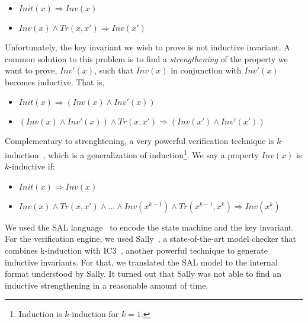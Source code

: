 \begin{itemize}
\item $Init(x) \Rightarrow Inv(x)$
\item $Inv(x) \wedge Tr(x,x') \Rightarrow Inv(x')$
\end{itemize}

Unfortunately, the key invariant we wish to prove is not inductive
invariant. A common solution to this problem is to find a
\emph{strengthening} of the property we want to prove, $Inv'(x)$, such
that $Inv(x)$ in conjunction with $Inv'(x)$ becomes inductive. That
is,

\begin{itemize}
\item $Init(x) \Rightarrow (Inv(x) \wedge Inv'(x))$
\item $(Inv(x) \wedge Inv'(x)) \wedge Tr(x,x') \Rightarrow (Inv(x') \wedge Inv'(x'))$
\end{itemize}

Complementary to strenghtening, a very powerful verification technique
is $k$-induction~\cite{MouraRS03}, which is a generalization of
induction\footnote{Induction is $k$-induction for $k=1$.}. We say a
property $Inv(x)$ is $k$-inductive if:

\begin{itemize}
\item $Init(x) \Rightarrow Inv(x)$
\item $Inv(x) \wedge Tr(x,x') \wedge \ldots \wedge Inv(x^{k-1}) \wedge Tr(x^{k-1},x^{k}) \Rightarrow Inv(x^{k})$
\end{itemize}


We used the SAL language~\cite{bensalem2000overview,sal2} to encode
the state machine and the key invariant. For the verification engine,
we used Sally~\cite{sally}, a state-of-the-art model checker that
combines k-induction with IC3~\cite{Bradley11}, another powerful
technique to generate inductive invariants.  For that, we translated
the SAL model to the internal format understood by Sally.  It turned
out that Sally was not able to find an inductive strengthening in a
reasonable amount of time.


